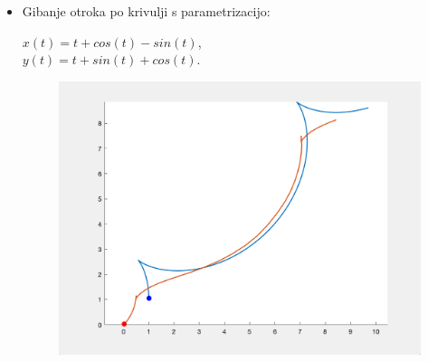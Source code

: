 \documentclass[a4paper,12pt]{article}
\begin{document}
\begin{itemize}
    \item Gibanje otroka po krivulji s parametrizacijo:
    \begin{center}
    $x(t) = t + cos(t) - sin(t)$, \\
    $y(t) = t + sin(t) + cos(t)$. 
    \end{center}      
    \begin{figure}[!h]
        \centering
        \includegraphics[scale=0.4]{Primer5}
    \end{figure}

\end{itemize}
\end{document}
